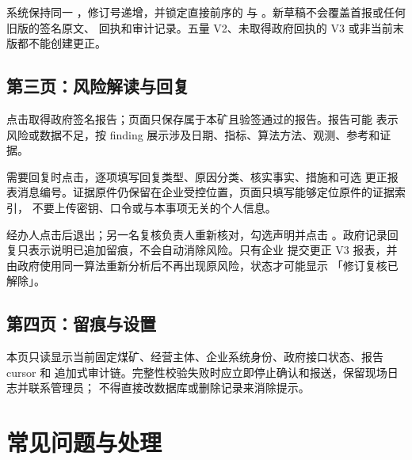 \documentclass[UTF8,openany,zihao=-4,fontset=none]{ctexbook}
\begin{document}
系统保持同一 ，修订号递增，并锁定直接前序的
 与 。新草稿不会覆盖首报或任何旧版的签名原文、
回执和审计记录。五量 V2、未取得政府回执的 V3 或非当前末版都不能创建更正。

\section{第三页：风险解读与回复}

点击取得政府签名报告；页面只保存属于本矿且验签通过的报告。报告可能
表示风险或数据不足，按 finding 展示涉及日期、指标、算法方法、观测、参考和证据。

需要回复时点击，逐项填写回复类型、原因分类、核实事实、措施和可选
更正报表消息编号。证据原件仍保留在企业受控位置，页面只填写能够定位原件的证据索引，
不要上传密钥、口令或与本事项无关的个人信息。

经办人点击后退出；另一名复核负责人重新核对，勾选声明并点击
。政府记录回复只表示说明已追加留痕，不会自动消除风险。只有企业
提交更正 V3 报表，并由政府使用同一算法重新分析后不再出现原风险，状态才可能显示
「修订复核已解除」。

\section{第四页：留痕与设置}

本页只读显示当前固定煤矿、经营主体、企业系统身份、政府接口状态、报告 cursor 和
追加式审计链。完整性校验失败时应立即停止确认和报送，保留现场日志并联系管理员；
不得直接改数据库或删除记录来消除提示。

\chapter{常见问题与处理}
\end{document}
